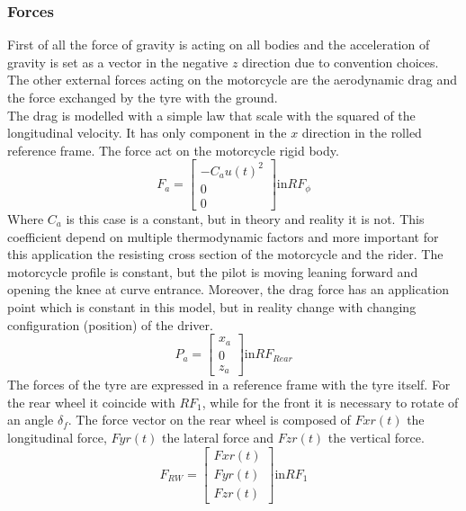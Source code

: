 \subsubsection{Forces}
%
First of all the force of gravity is acting on all bodies and the acceleration of gravity is set as a vector in the negative $z$ direction due to convention choices.\\
The other external forces acting on the motorcycle are the aerodynamic drag and the force exchanged by the tyre with the ground.\\
The drag is modelled with a simple law that scale with the squared of the longitudinal velocity. It has only component in the $x$ direction in the rolled reference frame. The force act on the motorcycle rigid body.
%
\begin{equation}
    F_a = 
    \left[
    \begin{array}{c}
        -C_a u(t)^2\\
        0\\
        0
    \end{array}
    \right ]
    \text{in} RF_\phi
\end{equation}
%
Where $C_a$ is this case is a constant, but in theory and reality it is not. This coefficient depend on multiple thermodynamic factors and more important for this application the resisting cross section of the motorcycle and the rider. The motorcycle profile is constant, but the pilot is moving leaning forward and opening the knee at curve entrance. 
Moreover, the drag force has an application point which is constant in this model, but in reality change with changing configuration (position) of the driver.
%
\begin{equation}
    P_a = 
    \left[
    \begin{array}{c}
        x_a\\
        0\\
        z_a
    \end{array}
    \right ]
    \text{in} RF_{Rear}
\end{equation}
%
The forces of the tyre are expressed in a reference frame with the tyre itself. For the rear wheel it coincide with $RF_1$, while for the front it is necessary to rotate of an angle $\delta_f$.
The force vector on the rear wheel is composed of $Fxr(t)$ the longitudinal force, $Fyr(t)$ the lateral force and $Fzr(t)$ the vertical force.
%
\begin{equation}
    F_{RW} = 
    \left[
    \begin{array}{c}
        Fxr(t)\\
        Fyr(t)\\
        Fzr(t)
    \end{array}
    \right ]
    \text{in} RF_1
\end{equation}
